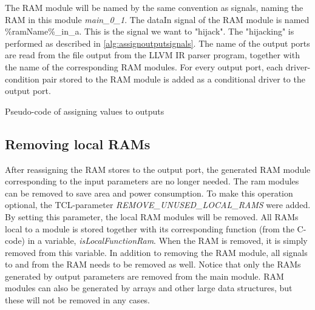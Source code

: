 The RAM module will be named by the same convention as signals, naming the RAM in this module \textit{main\_0\_1}. The dataIn signal of the RAM module is named \%ramName\%\_in\_a. This is the signal we want to "hijack". The "hijacking" is performed as described in \cref{alg:assignoutputsignals}. The name of the output ports are read from the file output from the LLVM IR parser program, together with the name of the corresponding RAM modules. For every output port, each driver-condition pair stored to the RAM module is added as a conditional driver to the output port.
\makeatletter
\let\OldStatex\Statex
\renewcommand{\Statex}[1][3]{%
  \setlength\@tempdima{\algorithmicindent}%
  \OldStatex\hskip\dimexpr#1\@tempdima\relax}
\makeatother
\begin{algorithm}
  \caption{Pseudo-code of assigning values to outputs
  \label{alg:assignoutputsignals}}
\end{algorithm}

\subsection{Removing local RAMs}
After reassigning the RAM stores to the output port, the generated RAM module corresponding to the input parameters are no longer needed. The ram modules can be removed to save area and power consumption. To make this operation optional, the TCL-parameter \textit{REMOVE\_UNUSED\_LOCAL\_RAMS} were added. By setting this parameter, the local RAM modules will be removed. All RAMs local to a module is stored together with its corresponding function (from the C-code) in a variable, \textit{isLocalFunctionRam}. When the RAM is removed, it is simply removed from this variable. In addition to removing the RAM module, all signals to and from the RAM needs to be removed as well. Notice that only the RAMs generated by output parameters are removed from the main module. RAM modules can also be generated by arrays and other large data structures, but these will not be removed in any cases.

